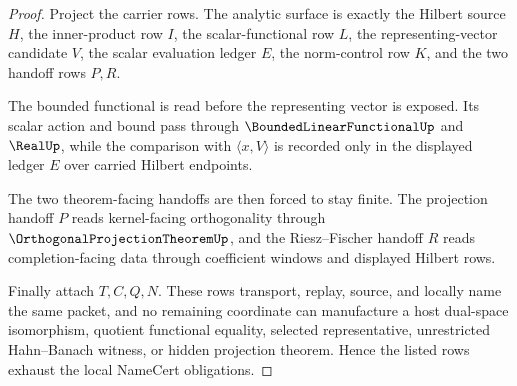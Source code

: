 \begin{proof}
Project the carrier rows. The analytic surface is exactly the Hilbert source $H$, the inner-product row $I$, the scalar-functional row $L$, the representing-vector candidate $V$, the scalar evaluation ledger $E$, the norm-control row $K$, and the two handoff rows $P,R$.

The bounded functional is read before the representing vector is exposed. Its scalar action and bound pass through $\BoundedLinearFunctionalUp$ and $\RealUp$, while the comparison with $\langle x,V\rangle$ is recorded only in the displayed ledger $E$ over carried Hilbert endpoints.

The two theorem-facing handoffs are then forced to stay finite. The projection handoff $P$ reads kernel-facing orthogonality through $\OrthogonalProjectionTheoremUp$, and the Riesz--Fischer handoff $R$ reads completion-facing data through coefficient windows and displayed Hilbert rows.

Finally attach $T,C,Q,N$. These rows transport, replay, source, and locally name the same packet, and no remaining coordinate can manufacture a host dual-space isomorphism, quotient functional equality, selected representative, unrestricted Hahn--Banach witness, or hidden projection theorem. Hence the listed rows exhaust the local NameCert obligations.
\end{proof}

